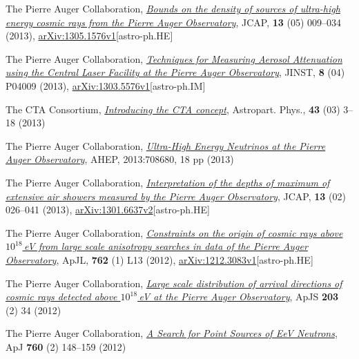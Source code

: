 \begin{etaremune}
\item {}The Pierre Auger Collaboration, \href{http://dx.doi.org/10.1088/1475-7516/2013/05/009}{\emph{Bounds on the density of sources of ultra-high energy cosmic rays from the Pierre Auger Observatory}}, JCAP, {\bf{13}} (05) 009--034 (2013), \href{http://arxiv.org/abs/1305.1576}{arXiv:1305.1576v1}[astro-ph.HE]

\item {}The Pierre Auger Collaboration, \href{http://dx.doi.org/10.1088/1748-0221/8/04/P04009}{\emph{Techniques for Measuring Aerosol Attenuation using the Central Laser Facility at the Pierre Auger Observatory}}, JINST, {\bf{8}} (04) P04009 (2013), \href{http://arxiv.org/abs/1303.5576}{arXiv:1303.5576v1}[astro-ph.IM]

\item {}The CTA Consortium, \href{http://dx.doi.org/10.1016/j.astropartphys.2013.01.007}{\emph{Introducing the CTA concept}}, Astropart. Phys., {\bf{43}} (03) 3--18 (2013)

\item {}The Pierre Auger Collaboration, \href{http://dx.doi.org/10.1155/2013/708680
}{\emph{Ultra-High Energy Neutrinos at the Pierre Auger Observatory}}, AHEP, 2013:708680, 18 pp (2013)

\item {}The Pierre Auger Collaboration, \href{http://dx.doi.org/10.1088/1475-7516/2013/02/026}{\emph{Interpretation of the depths of maximum of extensive air showers measured by the Pierre Auger Observatory}}, JCAP, {\bf{13}} (02) 026--041 (2013), \href{http://arxiv.org/abs/1301.6637}{arXiv:1301.6637v2}[astro-ph.HE]

\item {}The Pierre Auger Collaboration, \href{http://dx.doi.org/10.1088/2041-8205/762/1/L13}{\emph{Constraints on the origin of cosmic rays above $10^{18}$\,eV from large scale anisotropy searches in data of the Pierre Auger Observatory}}, ApJL, {\bf{762}} (1) L13 (2012), \href{http://arxiv.org/abs/1212.3083}{arXiv:1212.3083v1}[astro-ph.HE]

\item {}The Pierre Auger Collaboration,
\href{http://dx.doi.org/10.1088/0067-0049/203/2/34}{\emph{Large scale
distribution of arrival directions of cosmic rays detected above $10^{18}$\,eV
at the Pierre Auger Observatory}}, ApJS {\bf{203}} (2) 34 (2012)

\item {}The Pierre Auger Collaboration,
\href{http://dx.doi.org/10.1088/0004-637X/760/2/148}{\emph{A Search for Point
Sources of EeV Neutrons}}, ApJ {\bf{760}} (2) 148--159 (2012)


\end{etaremune}
